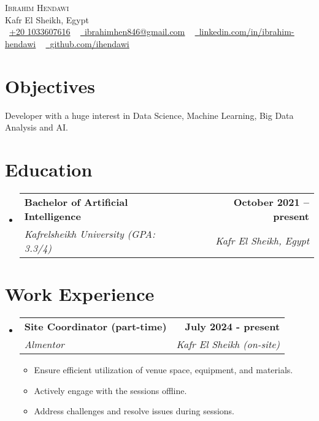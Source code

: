 \documentclass[letterpaper,11pt]{article}
\makeatletter
\newcommand{\resumeItem}[1]{
  \item\small{
    {#1 \vspace{-2pt}}
  }
}
\newcommand{\resumeSubheading}[4]{
  \vspace{-2pt}\item
    \begin{tabular*}{1.0\textwidth}[t]{l@{\extracolsep{\fill}}r}
      \textbf{#1} & \textbf{\small #2} \\
      \textit{\small#3} & \textit{\small #4} \\
    \end{tabular*}\vspace{-7pt}
}
\newcommand{\resumeSubHeadingListStart}{\begin{itemize}[leftmargin=0.0in, label={}]}
\newcommand{\resumeSubHeadingListEnd}{\end{itemize}}
\newcommand{\resumeItemListStart}{\begin{itemize}}
\newcommand{\resumeItemListEnd}{\end{itemize}\vspace{-5pt}}
\makeatother
\begin{document}
\begin{center}


  {\Huge \scshape Ibrahim Hendawi} \\ \vspace{1pt}
  Kafr El Sheikh, Egypt \\ \vspace{1pt}
  \small
  {\raisebox{-0.1\height}
  \faPhone\ 
  \underline{+20 1033607616}} ~ 
  \href{mialto:ibrahimhen846@gmail.com}
  {\raisebox{-0.2\height}
  \faEnvelope\
  \underline{ibrahimhen846@gmail.com}} ~
  \href{https://www.linkedin.com/in/ibrahim-hendawi-7a5655217/}
  {\raisebox{-0.2\height}
  \faLinkedin\ 
  \underline{linkedin.com/in/ibrahim-hendawi}}  ~
  \href{https://github.com/ihendawi}
  {\raisebox{-0.2\height}
  \faGithub\ 
  \underline{github.com/ihendawi}}
  \vspace{-8pt}


\end{center}


\section{Objectives}
Developer with a huge interest in Data Science, Machine Learning, Big Data Analysis and AI.


\section{Education}
  \resumeSubHeadingListStart
    \resumeSubheading
      {Bachelor of Artificial Intelligence}{October 2021 -- present}
      {Kafrelsheikh University (GPA: 3.3/4)}{Kafr El Sheikh, Egypt}
      
  \resumeSubHeadingListEnd
  \vspace{-13pt}


\section{Work Experience}
  \resumeSubHeadingListStart
    \resumeSubheading
      {Site Coordinator (part-time)}{July 2024 - present}
      {Almentor}{Kafr El Sheikh (on-site)}
      \resumeItemListStart
        \resumeItem{
          Ensure efficient utilization of venue space, equipment, and materials.
        }
        \resumeItem{
          Actively engage with the sessions offline.
        }
        \resumeItem{
          Address challenges and resolve issues during sessions.
        }
      \resumeItemListEnd
  \resumeSubHeadingListEnd
\end{document}
